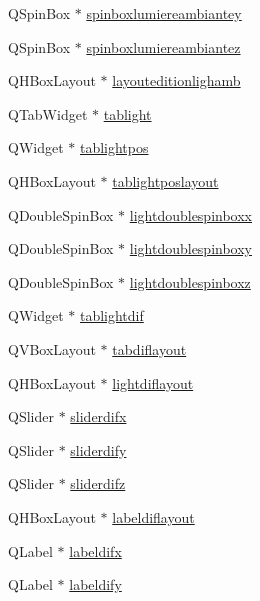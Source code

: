\begin{DoxyCompactItemize}
Q\+Spin\+Box $\ast$ \hyperlink{class_mondock_a540926c2bc676ba4e02b2760375a2ece}{spinboxlumiereambiantey}
\item 
Q\+Spin\+Box $\ast$ \hyperlink{class_mondock_aec59b2c7f6b841c599de75311a952e35}{spinboxlumiereambiantez}
\item 
Q\+H\+Box\+Layout $\ast$ \hyperlink{class_mondock_a96c9d3320d5658f31580b10cb31ef5c5}{layouteditionlighamb}
\item 
Q\+Tab\+Widget $\ast$ \hyperlink{class_mondock_aff9f46d61c662d10837346c496160ed1}{tablight}
\item 
Q\+Widget $\ast$ \hyperlink{class_mondock_af55525ced19bade9444f69f28ceb63bb}{tablightpos}
\item 
Q\+H\+Box\+Layout $\ast$ \hyperlink{class_mondock_aa1e272ef1c0db51aac8861812e367b27}{tablightposlayout}
\item 
Q\+Double\+Spin\+Box $\ast$ \hyperlink{class_mondock_a16569a61106b1c9d6506d1d2a2600759}{lightdoublespinboxx}
\item 
Q\+Double\+Spin\+Box $\ast$ \hyperlink{class_mondock_a5829d9ba58222d9ec1905d9b81efeea2}{lightdoublespinboxy}
\item 
Q\+Double\+Spin\+Box $\ast$ \hyperlink{class_mondock_a7f9c9c2b765d28670aac280b38773ee9}{lightdoublespinboxz}
\item 
Q\+Widget $\ast$ \hyperlink{class_mondock_a7e42b87b7c1088da35395d5f1ef690d8}{tablightdif}
\item 
Q\+V\+Box\+Layout $\ast$ \hyperlink{class_mondock_a2691df29ebeefa273d759a15eb4c9f51}{tabdiflayout}
\item 
Q\+H\+Box\+Layout $\ast$ \hyperlink{class_mondock_a82bd5ea86bfd95368bdef210a807b1c4}{lightdiflayout}
\item 
Q\+Slider $\ast$ \hyperlink{class_mondock_a1d4f04858d8142be0a35b1aad9f14345}{sliderdifx}
\item 
Q\+Slider $\ast$ \hyperlink{class_mondock_a61a2ab20f30425efa13abc19241dfcb7}{sliderdify}
\item 
Q\+Slider $\ast$ \hyperlink{class_mondock_af68d00a8f6995732dc8f5861b1b64de2}{sliderdifz}
\item 
Q\+H\+Box\+Layout $\ast$ \hyperlink{class_mondock_a2cc5ecc094ac129ac7cf6c70147b8d29}{labeldiflayout}
\item 
Q\+Label $\ast$ \hyperlink{class_mondock_adc2193f6756de65b0d3a3f5a3a0e7164}{labeldifx}
\item 
Q\+Label $\ast$ \hyperlink{class_mondock_ab869df2ebba1417ef476ae6df23084f3}{labeldify}
\item 

\end{DoxyCompactItemize}
